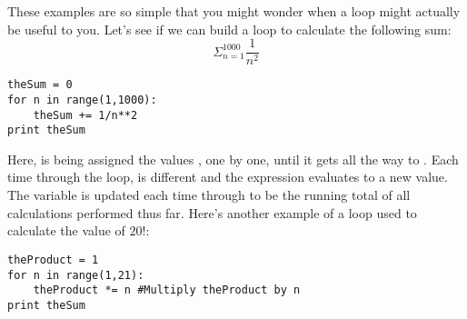 These examples are so simple that you might wonder when a loop might
actually be useful to you.  Let's see if we can build a loop to
calculate the following sum:
\begin{equation}
\Sigma_{n=1}^{1000} \frac{1}{n^2}
\end{equation}
\begin{Verbatim}
theSum = 0
for n in range(1,1000):
    theSum += 1/n**2
print theSum
\end{Verbatim}
Here,  is being assigned the values
, one by one, until it gets all the way to
.  Each time through the loop,  is different
and the expression  evaluates to a new value.  The
variable  is updated each time through to be the
running total of all calculations performed thus far.  Here's another
example of a loop used to calculate the value of $20!$:
\begin{Verbatim}
theProduct = 1
for n in range(1,21):
    theProduct *= n #Multiply theProduct by n
print theSum
\end{Verbatim}
